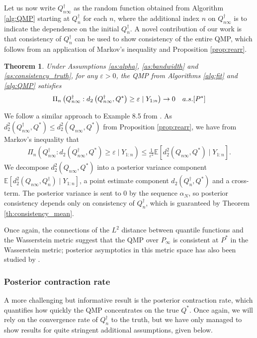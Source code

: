 \documentclass[11pt,a4paper]{article}
\newtheorem{theorem}{Theorem}%
\newenvironment{proof_outline}{\begin{proof}[Proof outline]}{\end{proof}}
\newcommand{\E}{\mathbb{E}}
\begin{document}
Let us now write $Q_{n\infty}^{\dagger}$ as the random function obtained from {Algorithm \ref{alg:QMP}} starting at $Q_n^{\dagger}$ for each $n$, where the additional index $n$ on $Q_{n\infty}^{\dagger}$ is to indicate the dependence on the initial $Q_n^{\dagger}$. A novel contribution of our work is that consistency of $Q_n^{\dagger}$ can be used to show consistency of the entire QMP, which follows from an application of Markov's inequality and {Proposition \ref{prop:rearr}}.
\begin{theorem}\label{th:consistency}
    Under  {Assumptions \ref{as:alpha}},  {\ref{as:bandwidth}} and  {\ref{as:consistency_truth}}, for any $\varepsilon > 0$, the QMP from {Algorithms \ref{alg:fit}} and  {\ref{alg:QMP}} satisfies
    \begin{align*}
\Pi_n\left(Q^{\dagger}_{n\infty}: d_2\left(Q^{\dagger}_{n\infty},Q^*\right) \geq \varepsilon \mid Y_{1:n}\right) \to 0 \quad \textnormal{a.s.}[P^*]
    \end{align*}
\end{theorem}
\begin{proof_outline}
    We follow a similar approach to Example 8.5 from \cite{Ghosal2017}.
    As $d_2^2(Q^{\dagger}_{n\infty}, Q^*) \leq d_2^2\left(Q_{n\infty}, Q^*\right)$ from {Proposition \ref{prop:rearr}}, we have from Markov's inequality that
    \begin{align*}
        \Pi_n\left(Q^{\dagger}_{n\infty}: d_2\left(Q^{\dagger}_{n\infty},Q^*\right) \geq \varepsilon \mid Y_{1:n}\right) \leq \frac{1}{\varepsilon^2 }\E\left[d^2_2\left(Q_{n\infty},Q^*\right)\mid Y_{1:n}\right].
    \end{align*}
 We decompose $d^2_2\left(Q_{n\infty},Q^*\right)$ into a posterior variance component $\E[d^2_2(Q_{n\infty}, Q_n^{\dagger}) \mid Y_{1:n}]$, a point estimate component $d_2( Q_n^{\dagger},Q^*)$ and a cross-term. The posterior variance is sent to 0 by the sequence  $\alpha_N$, so posterior consistency depends only on consistency of $Q_n^{\dagger}$, which is guaranteed by 
    {Theorem \ref{th:consistency_mean}}.
\end{proof_outline}
Once again, the connections of the $L^2$ distance between quantile functions and the Wasserstein  metric suggest that the QMP over $P_\infty$ is consistent at $P^*$ in the Wasserstein metric; posterior asymptotics in this metric space has also been studied by \cite{Chae2021}. 


\subsubsection{Posterior contraction rate}\label{sec:contraction}
A more challenging but informative result is the posterior contraction rate, which quantifies how quickly the QMP concentrates on the true $Q^*$. Once again, we will rely on the convergence rate of $Q_n^{\dagger}$ to the truth, but we have only managed to show results for quite stringent additional assumptions, given below.
\end{document}
